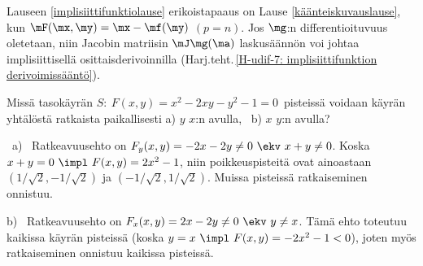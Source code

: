 Lauseen \ref{implisiittifunktiolause} erikoistapaaus on Lause \ref{käänteiskuvauslause},
kun $\mF(\mx,\my)=\mx-\mf(\my)$ $(p=n)$. Jos $\mg$:n differentioituvuus oletetaan, niin Jacobin
matriisin $\mJ\mg(\ma)$ laskusäännön voi johtaa implisiittisellä osittaisderivoinnilla 
(Harj.teht.\,\ref{H-udif-7: implisiittifunktion derivoimissääntö}).
\begin{Exa}
Missä tasokäyrän $S:\ F(x,y)=x^2-2xy-y^2-1=0\,$ pisteissä voidaan käyrän yhtälöstä ratkaista
paikallisesti a) $y$ $x$:n avulla, \, b) $x$ $y$:n avulla?
\end{Exa}
\ratk \ a) \, Ratkeavuusehto on $F_y(x,y)=-2x-2y\neq 0\ \ekv\ x+y\neq 0$. Koska 
$x+y=0 \ \impl \ F(x,y)=2x^2-1$, niin poikkeuspisteitä ovat ainoastaan 
$(1/\sqrt{2},-1/\sqrt{2})$ ja $(-1/\sqrt{2},1/\sqrt{2})$. Muissa pisteissä ratkaiseminen
onnistuu.

b) \, Ratkeavuusehto on $F_x(x,y)=2x-2y\neq 0\ \ekv\ y\neq x$. Tämä ehto toteutuu
kaikissa käyrän pisteissä (koska $y=x \ \impl \ F(x,y)=-2x^2-1<0$), joten myös
ratkaiseminen onnistuu kaikissa pisteissä. \loppu

